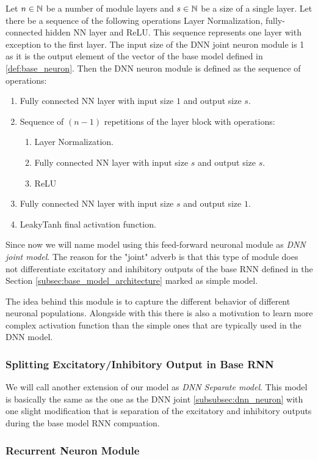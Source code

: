 \begin{defn}
    Let $n \in \mathbb{N}$ be a number of module layers and $s \in \mathbb{N}$ be a size of a single layer. Let there be a sequence of the following operations Layer Normalization, fully-connected hidden NN layer and ReLU. This sequence represents one layer with exception to the first layer. The input size of the DNN joint neuron module is 1 as it is the output element of the vector of the base model defined in \ref{def:base_neuron}. Then the DNN neuron module is defined as the sequence of operations:
    \begin{enumerate}
        \item Fully connected NN layer with input size $1$ and output size $s$.
        \item Sequence of $(n-1)$ repetitions of the layer block with operations:
            \begin{enumerate}
                \item Layer Normalization.
                \item Fully connected NN layer with input size $s$ and output size $s$.
                \item ReLU
            \end{enumerate}
        \item Fully connected NN layer with input size $s$ and output size $1$.
        \item LeakyTanh final activation function.
    \end{enumerate}
\end{defn}
\label{def:dnn_joint}

Since now we will name model using this feed-forward neuronal module as \emph{DNN joint model}. The reason for the "joint" adverb is that this type of module does not differentiate excitatory and inhibitory outputs of the base RNN defined in the Section \ref{subsec:base_model_architecture} marked as simple model.

The idea behind this module is to capture the different behavior of different neuronal populations. Alongside with this there is also a motivation to learn more complex activation function than the simple ones that are typically used in the DNN model.

\subsubsection{Splitting Excitatory/Inhibitory Output in Base RNN}
\label{subsubsec:dnn_separate}
We will call another extension of our model as \emph{DNN Separate model}. This model is basically the same as the one as the DNN joint \ref{subsubsec:dnn_neuron} with one slight modification that is separation of the excitatory and inhibitory outputs during the base model RNN compuation.

\subsubsection{Recurrent Neuron Module}
\label{subsubsec:rnn_neuron_module}

